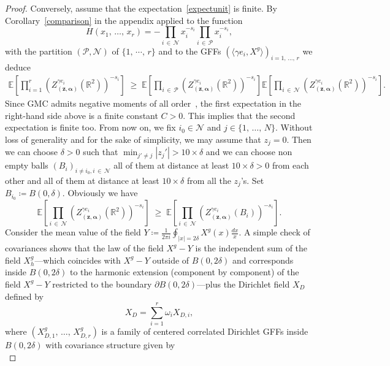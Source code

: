 \documentclass[10pt]{amsart}
\theoremstyle{definition}\newtheorem{defi}[theo]{Definition}\newtheorem{rema}[theo]{Remark}\newtheorem{exam}[theo]{Example}\newtheorem{exem}[theo]{Example}\newtheorem{nota}[theo]{Notation}
\renewcommand{\geq}{\;\geqslant\;}
\newcommand{\clP}{\mathcal{P}}
\newcommand{\clN}{\mathcal{N}}
\newcommand{\R}{\mathbb{R}}
\newcommand{\E}{\mathbb{E}}
\begin{document}
\begin{proof}
Conversely, assume that the expectation~\eqref{expectunit} is finite. By Corollary~\ref{comparison} in the appendix applied to the function
\[
H(x_1,\,\dots,\,x_r)= -\prod_{i\,\in\,\clN} x_i^{- s_i} \prod_{i\,\in\,\clP} x_i^{- s_i},
\]
with the partition $(\clP,\clN)$ of $\{1,\,\cdots,\,r\}$ and to the GFFs $(\langle \gamma e_i,X^g\rangle)_{i=1,\,\dots,\,r}$ we deduce
\begin{align*}
\E \left[\prod_{i=1}^{r} \left(Z_{\left(\bm z,\bm \alpha\right)}^{\gamma e_i}\left(\R^2\right)\right)^{- s_i} \right] \geq \E \left[\prod_{i\,\in\,\clP} \left(Z_{\left(\bm z,\bm \alpha\right)}^{\gamma e_i} \left(\R^2\right)\right)^{- s_i} \right] \E \left[\prod_{i\,\in\,\clN} \left(Z_{\left(\bm z,\bm \alpha\right)}^{\gamma e_i} \left(\R^2\right)\right)^{- s_i} \right].
\end{align*}
Since GMC admits negative moments of all order~\cite[Theorem~2.12]{review}, the first expectation in the right-hand side above is a finite constant $C>0$. This implies that the second expectation is finite too. From now on, we fix $i_0\in \clN$ and $j\in\{1,\,\dots,\,N\}$. Without loss of generality and for the sake of simplicity, we may assume that $z_j=0$. Then we can choose $\delta>0$ such that $\min_{j'\not=j}|z_j'|>10\times\delta$ and we can choose non empty balls $(B_i)_{i\not= i_0,i\,\in\,\clN}$ all of them at distance at least $10\times\delta>0$ from each other and all of them at distance at least $10\times \delta$ from all the $z_j$'s. Set $B_{i_0}\coloneqq B(0,\delta)$. Obviously we have
\[
\E \left[\prod_{i\,\in \,\clN} \left(Z_{\left(\bm z,\bm \alpha\right)}^{\gamma e_i} \left(\R^2\right)\right)^{- s_i} \right] \geq \E \left[\prod_{i\,\in\,\clN} \left(Z_{\left(\bm z,\bm \alpha\right)}^{\gamma e_i} \left(B_i\right)\right)^{- s_i} \right].
\]
Consider the mean value of the field $Y\coloneqq \frac{1}{2\pi i}\oint_{|x|=2\delta}X^g(x)\frac{dx}{x}$. A simple check of covariances shows that the law of the field $X^g-Y$ is the independent sum of the field $X^g_h$---which coincides with $X^g-Y$ outside of $B(0,2\delta)$ and corresponds inside $ B(0,2\delta)$ to the harmonic extension (component by component) of the field $X^g-Y$ restricted to the boundary $ \partial B(0,2\delta)$---plus the Dirichlet field $X_D$ defined by
\begin{equation}
X_D=\sum_{i=1}^{r}\omega_iX_{D,i},
\end{equation}
where $(X^g_{D,1},\,\dots,\,X^g_{D,r})$ is a family of centered correlated Dirichlet GFFs inside $B(0,2\delta)$ with covariance structure given by
\begin{equation*}

\end{equation*}
\end{proof}
\end{document}
